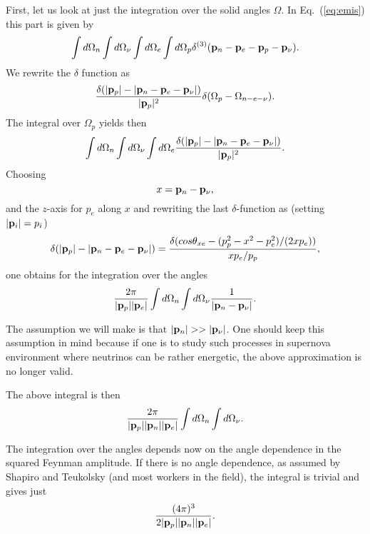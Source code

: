 First, let us look at just the integration over the solid angles $\Omega$.
In Eq.\ (\ref{eq:emis}) this part is given by
\begin{equation}
    \int d\Omega_n \int d\Omega_{\nu} \int d\Omega_e \int d\Omega_p
    \delta^{(3)}({\bf p}_n-{\bf p}_e-{\bf p}_p-{\bf p}_{\nu}).
\end{equation}
We rewrite the $\delta$ function as
\begin{equation}
   \frac{\delta(|{\bf p}_p|-|{\bf p}_n-{\bf p}_e-{\bf p}_{\nu}|)}{|{\bf p}_p|^2}
   \delta(\Omega_p-\Omega_{n-e-\nu}).
\end{equation}
The integral over $\Omega_p$ yields then
\begin{equation}
    \int d\Omega_n \int d\Omega_{\nu} \int d\Omega_e 
    \frac{\delta(|{\bf p}_p|-|{\bf p}_n-{\bf p}_e-{\bf p}_{\nu}|)}{|{\bf p}_p|^2}.
\end{equation}
Choosing
\begin{equation}
      x= {\bf p}_n-{\bf p}_{\nu},
\end{equation} 
and the $z$-axis for $p_e$ along $x$ and 
rewriting the last $\delta$-function as (setting $|{\bf p}_i|= p_i$) 
\begin{equation}
     \delta(|{\bf p}_p|-|{\bf p}_n-{\bf p}_e-{\bf p}_{\nu}|)=
     \frac{\delta(cos\theta_{xe} -(p_p^2-x^2-p_e^2)/(2xp_e))}
     {xp_e/p_p},
\end{equation}
one obtains for the integration over the angles
\begin{equation}
    \frac{2\pi}{|{\bf p}_p||{\bf p}_e|}\int d\Omega_n \int d\Omega_{\nu}
    \frac{1}{|{\bf p}_n-{\bf p}_{\nu}|}.
\end{equation}

The assumption we will make is that $|{\bf p}_n| >> |{\bf p}_{\nu}|$.
One should keep this assumption in mind because if one is to study 
such processes in supernova environment where neutrinos can be rather
energetic, the above approximation is no longer valid.

The above integral is then
\begin{equation}
    \frac{2\pi}{|{\bf p}_p||{\bf p}_n||{\bf p}_e|}\int d\Omega_n \int d\Omega_{\nu}.
    \label{eq:int}
\end{equation}

The integration over the angles depends now on the angle dependence in the 
squared Feynman amplitude. If there is no angle dependence, as assumed by
Shapiro and Teukolsky (and most workers in the field), the integral
is trivial and gives just
\begin{equation}
    \frac{(4\pi)^3}{2|{\bf p}_p||{\bf p}_n||{\bf p}_e|}.
\end{equation}


